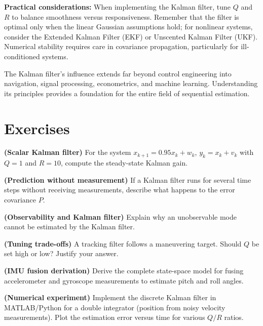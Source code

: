 \textbf{Practical considerations:} When implementing the Kalman filter, tune $Q$ and $R$ to balance smoothness versus responsiveness. Remember that the filter is optimal only when the linear Gaussian assumptions hold; for nonlinear systems, consider the Extended Kalman Filter (EKF) or Unscented Kalman Filter (UKF). Numerical stability requires care in covariance propagation, particularly for ill-conditioned systems.

The Kalman filter's influence extends far beyond control engineering into navigation, signal processing, econometrics, and machine learning. Understanding its principles provides a foundation for the entire field of sequential estimation.

\newpage
\section{Exercises}

\begin{exercise}
\textbf{(Scalar Kalman filter)} For the system $x_{k+1} = 0.95x_k + w_k$, $y_k = x_k + v_k$ with $Q = 1$ and $R = 10$, compute the steady-state Kalman gain.
\end{exercise}

\begin{exercise}
\textbf{(Prediction without measurement)} If a Kalman filter runs for several time steps without receiving measurements, describe what happens to the error covariance $P$.
\end{exercise}

\begin{exercise}
\textbf{(Observability and Kalman filter)} Explain why an unobservable mode cannot be estimated by the Kalman filter.
\end{exercise}

\begin{exercise}
\textbf{(Tuning trade-offs)} A tracking filter follows a maneuvering target. Should $Q$ be set high or low? Justify your answer.
\end{exercise}

\begin{exercise}
\textbf{(IMU fusion derivation)} Derive the complete state-space model for fusing accelerometer and gyroscope measurements to estimate pitch and roll angles.
\end{exercise}

\begin{exercise}
\textbf{(Numerical experiment)} Implement the discrete Kalman filter in MATLAB/Python for a double integrator (position from noisy velocity measurements). Plot the estimation error versus time for various $Q/R$ ratios.
\end{exercise}

